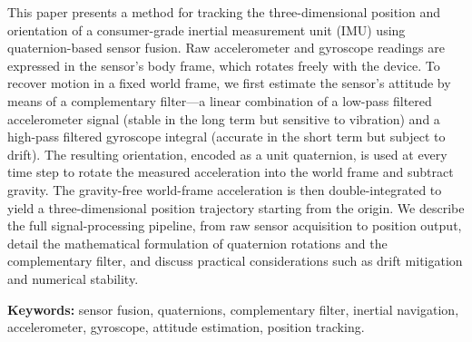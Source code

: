 This paper presents a method for tracking the three-dimensional position and
orientation of a consumer-grade inertial measurement unit (IMU) using
quaternion-based sensor fusion. Raw accelerometer and gyroscope readings are
expressed in the sensor's body frame, which rotates freely with the device. To
recover motion in a fixed world frame, we first estimate the sensor's attitude
by means of a complementary filter---a linear combination of a low-pass
filtered accelerometer signal (stable in the long term but sensitive to
vibration) and a high-pass filtered gyroscope integral (accurate in the short
term but subject to drift). The resulting orientation, encoded as a unit
quaternion, is used at every time step to rotate the measured acceleration into
the world frame and subtract gravity. The gravity-free world-frame acceleration
is then double-integrated to yield a three-dimensional position trajectory
starting from the origin. We describe the full signal-processing pipeline, from
raw sensor acquisition to position output, detail the mathematical formulation
of quaternion rotations and the complementary filter, and discuss practical
considerations such as drift mitigation and numerical stability.

\vspace{0.3em}
\noindent\textbf{Keywords:} sensor fusion, quaternions, complementary filter,
inertial navigation, accelerometer, gyroscope, attitude estimation, position
tracking.

